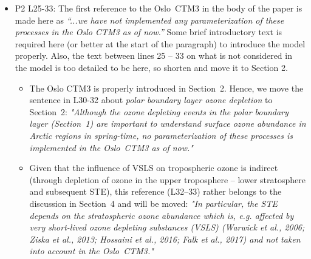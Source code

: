 \documentclass{scrartcl}
\begin{document}
\begin{itemize}
\item {\color{blue}  P2 L25-33: The first reference to the Oslo~CTM3 in the body of the paper is
  made here as \emph{“...we have not implemented any parameterization of these processes
    in the Oslo CTM3 as of now.”} Some brief introductory text is required here (or better at
  the start of the paragraph) to introduce the model properly. Also, the text between lines
  25 -- 33 on what is not considered in the model is too detailed to be here, so shorten
  and move it to Section 2.}
  \begin{itemize}
  \item The Oslo CTM3 is properly introduced in Section~2. Hence, we move the sentence in L30-32 about \emph{polar boundary layer ozone depletion} to Section~2:
    \emph{"Although the ozone depleting events in the polar boundary layer (Section~1) are important to understand surface ozone abundance in Arctic regions in spring-time, no parameterization of these processes is implemented in the Oslo~CTM3 as of now."}
  \item Given that the influence of VSLS on tropospheric ozone is indirect (through depletion of ozone in the upper troposphere -- lower stratosphere and subsequent STE), this reference (L32--33) rather belongs to the discussion in Section~4 and will be moved:
    \emph{"In particular, the STE depends on the stratospheric ozone abundance which is, e.g. affected by very short-lived ozone depleting substances (VSLS) (Warwick et al., 2006; Ziska et al., 2013; Hossaini et al., 2016; Falk et al., 2017) and not taken into account in the Oslo~CTM3."}
  \end{itemize}


\end{itemize}
\end{document}
